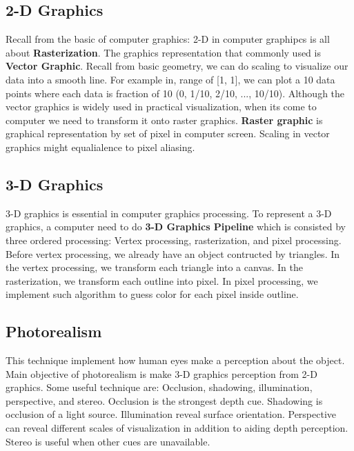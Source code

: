 \documentclass[11pt]{article}
\begin{document}
    \subsection{2-D Graphics}\label{d-graphics}

Recall from the basic of computer graphics: 2-D in computer graphipcs is
all about \textbf{Rasterization}. The graphics representation that
commonly used is \textbf{Vector Graphic}. Recall from basic geometry, we
can do scaling to visualize our data into a smooth line. For example in,
range of {[}1, 1{]}, we can plot a 10 data points where each data is
fraction of 10 (0, 1/10, 2/10, ..., 10/10). Although the vector graphics
is widely used in practical visualization, when its come to computer we
need to transform it onto raster graphics. \textbf{Raster graphic} is
graphical representation by set of pixel in computer screen. Scaling in
vector graphics might equalialence to pixel aliasing.

    \subsection{3-D Graphics}\label{d-graphics}

3-D graphics is essential in computer graphics processing. To represent
a 3-D graphics, a computer need to do \textbf{3-D Graphics Pipeline}
which is consisted by three ordered processing: Vertex processing,
rasterization, and pixel processing. Before vertex processing, we
already have an object contructed by triangles. In the vertex
processing, we transform each triangle into a canvas. In the
rasterization, we transform each outline into pixel. In pixel
processing, we implement such algorithm to guess color for each pixel
inside outline.

    \subsection{Photorealism}\label{photorealism}

This technique implement how human eyes make a perception about the
object. Main objective of photorealism is make 3-D graphics perception
from 2-D graphics. Some useful technique are: Occlusion, shadowing,
illumination, perspective, and stereo. Occlusion is the strongest depth
cue. Shadowing is occlusion of a light source. Illumination reveal
surface orientation. Perspective can reveal different scales of
visualization in addition to aiding depth perception. Stereo is useful
when other cues are unavailable.
\end{document}
